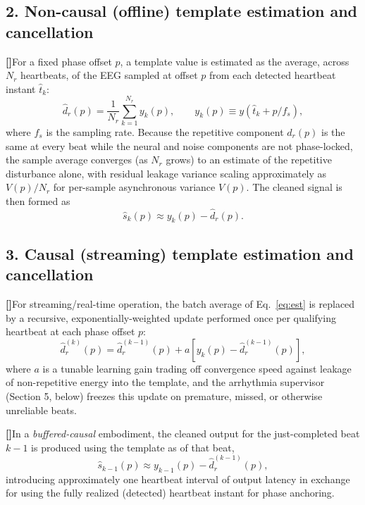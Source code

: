 \documentclass[12pt]{article}
\newcommand{\dhat}{\widehat{d}}
\newcounter{para}
\newcommand{\parnum}{\stepcounter{para}\noindent\textbf{[\thepara]}\quad}
\begin{document}
\subsection*{2. Non-causal (offline) template estimation and cancellation}

\parnum For a fixed phase offset $p$, a template value is estimated as the average, across $N_r$ heartbeats, of the EEG sampled at offset $p$ from each detected heartbeat instant $\hat t_k$:
\begin{equation}
\dhat_r(p) = \frac{1}{N_r}\sum_{k=1}^{N_r} y_k(p),
\qquad
y_k(p) \equiv y(\hat t_k + p/f_s),
\label{eq:est}
\end{equation}
where $f_s$ is the sampling rate. Because the repetitive component $d_r(p)$ is the same at every beat while the neural and noise components are not phase-locked, the sample average converges (as $N_r$ grows) to an estimate of the repetitive disturbance alone, with residual leakage variance scaling approximately as $V(p)/N_r$ for per-sample asynchronous variance $V(p)$. The cleaned signal is then formed as
\begin{equation}
\widehat{s}_k(p) \approx y_k(p) - \dhat_r(p).
\label{eq:ideal}
\end{equation}

\subsection*{3. Causal (streaming) template estimation and cancellation}

\parnum For streaming/real-time operation, the batch average of Eq.~\eqref{eq:est} is replaced by a recursive, exponentially-weighted update performed once per qualifying heartbeat at each phase offset $p$:
\begin{equation}
\hat{d}_r^{(k)}(p) = \hat{d}_r^{(k-1)}(p) + a\left[y_k(p) - \hat{d}_r^{(k-1)}(p)\right],
\label{eq:causal_ilc_update}
\end{equation}
where $a$ is a tunable learning gain trading off convergence speed against leakage of non-repetitive energy into the template, and the arrhythmia supervisor (Section 5, below) freezes this update on premature, missed, or otherwise unreliable beats.

\parnum In a \emph{buffered-causal} embodiment, the cleaned output for the just-completed beat $k-1$ is produced using the template as of that beat,
\begin{equation}
\widehat{s}_{k-1}(p) \approx y_{k-1}(p) - \hat{d}_r^{(k-1)}(p),
\end{equation}
introducing approximately one heartbeat interval of output latency in exchange for using the fully realized (detected) heartbeat instant for phase anchoring.
\end{document}

